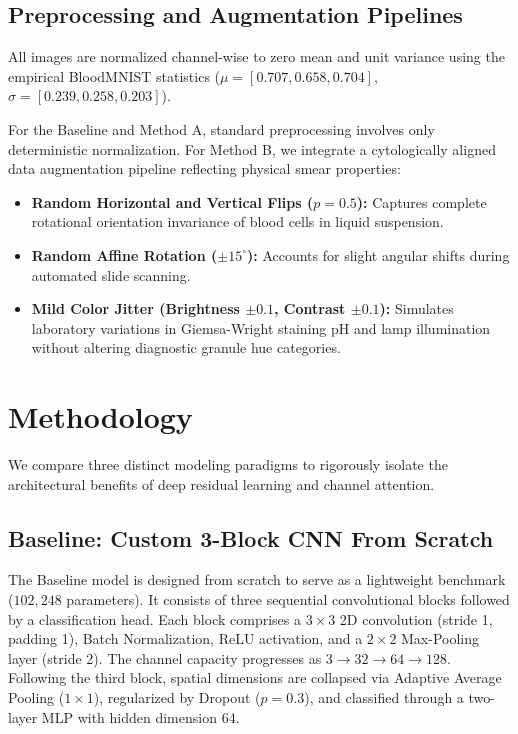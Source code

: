 \documentclass[conference]{IEEEtran}
\begin{document}
\subsection{Preprocessing and Augmentation Pipelines}
All images are normalized channel-wise to zero mean and unit variance using the empirical BloodMNIST statistics ($\mu = [0.707, 0.658, 0.704]$, $\sigma = [0.239, 0.258, 0.203]$).

For the Baseline and Method A, standard preprocessing involves only deterministic normalization. For Method B, we integrate a cytologically aligned data augmentation pipeline reflecting physical smear properties:
\begin{itemize}
    \item \textbf{Random Horizontal and Vertical Flips ($p = 0.5$):} Captures complete rotational orientation invariance of blood cells in liquid suspension.
    \item \textbf{Random Affine Rotation ($\pm 15^\circ$):} Accounts for slight angular shifts during automated slide scanning.
    \item \textbf{Mild Color Jitter (Brightness $\pm 0.1$, Contrast $\pm 0.1$):} Simulates laboratory variations in Giemsa-Wright staining pH and lamp illumination without altering diagnostic granule hue categories.
\end{itemize}

\section{Methodology}
We compare three distinct modeling paradigms to rigorously isolate the architectural benefits of deep residual learning and channel attention.

\subsection{Baseline: Custom 3-Block CNN From Scratch}
The Baseline model is designed from scratch to serve as a lightweight benchmark ($102,248$ parameters). It consists of three sequential convolutional blocks followed by a classification head. Each block comprises a $3 \times 3$ 2D convolution (stride 1, padding 1), Batch Normalization, ReLU activation, and a $2 \times 2$ Max-Pooling layer (stride 2). The channel capacity progresses as $3 \to 32 \to 64 \to 128$. Following the third block, spatial dimensions are collapsed via Adaptive Average Pooling ($1 \times 1$), regularized by Dropout ($p = 0.3$), and classified through a two-layer MLP with hidden dimension 64.
\end{document}
